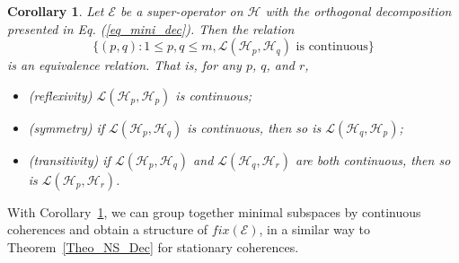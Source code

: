 \documentclass[journal]{IEEEtran}
\def\h{\ensuremath{\mathcal{H}}}
\def\l{\ensuremath{\mathcal{L}}}
\def\e{\ensuremath{\mathcal{E}}}
\def\l{\ensuremath{\mathcal{L}}}
\def\l{\mathcal{L}}
\newtheorem{corollary}{Corollary}
\begin{document}
\begin{corollary}\label{cor_cc_eq}
Let $\e$ be a super-operator on $\h$ with the orthogonal decomposition presented in Eq. (\ref{eq_mini_dec}). 
Then the relation 
$$\{(p, q) : 1\leq p, q\leq m,  \l(\h_p,\h_q)  \mbox{ is continuous}\}$$
 is an equivalence relation. That is,
  for any $p$, $q$, and $r$, \begin{itemize}
    \item [(1)] (reflexivity) $\l(\h_p,\h_p)$ is continuous;
    \item [(2)] (symmetry) if $\l(\h_p,\h_q)$ is continuous, then so is $\l(\h_q,\h_p)$;
    \item [(3)] (transitivity) if $\l(\h_p,\h_q)$ and $\l(\h_q,\h_r)$ are both continuous, then so is $\l(\h_p,\h_r)$.
      \end{itemize}
\end{corollary}


With Corollary~\ref{cor_cc_eq}, we can group together minimal subspaces by continuous coherences and obtain a structure of $fix(\e)$, in a similar way to Theorem~\ref{Theo_NS_Dec} for stationary coherences. 
\end{document}
